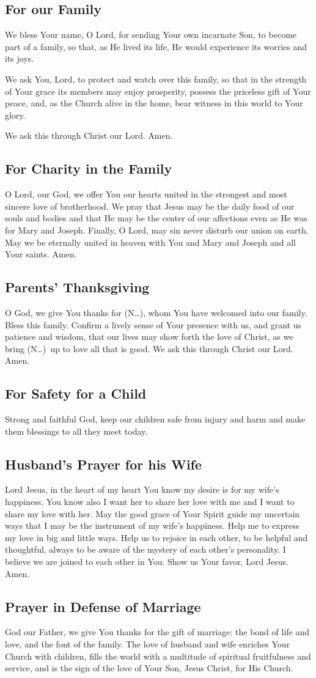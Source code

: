 \documentclass[12pt]{article}
\newcommand{\prayertitle}[1]{\subsection{#1}}
\newcommand{\insertname}{(N\dots)}
\begin{document}
\prayertitle{For our Family}
We bless Your name, O Lord, for sending Your own incarnate Son, to become part of a family, so that, as He lived its life, He would experience its worries and its joys.

We ask You, Lord, to protect and watch over this family, so that in the strength of Your grace its members may enjoy prosperity, possess the priceless gift of Your peace, and, as the Church alive in the home, bear witness in this world to Your glory.

We ask this through Christ our Lord.
Amen.
\newpage
\prayertitle{For Charity in the Family}
O Lord, our God, we offer You our hearts united in the strongest and most sincere love of brotherhood.
We pray that Jesus may be the daily food of our souls and bodies and that He may be the center of our affections even as He was for Mary and Joseph.
Finally, O Lord, may sin never disturb our union on earth.
May we be eternally united in heaven with You and Mary and Joseph and all Your saints.
Amen.

\prayertitle{Parents' Thanksgiving}
O God, we give You thanks for \insertname, whom You have welcomed into our family.
Bless this family.
Confirm a lively sense of Your presence with us, and grant us patience and wisdom, that our lives may show forth the love of Christ, as we bring \insertname\ up to love all that is good.
We ask this through Christ our Lord.
Amen.

\prayertitle{For Safety for a Child}
Strong and faithful God, keep our children safe from injury and harm and make them blessings to all they meet today.

\prayertitle{Husband's Prayer for his Wife}
Lord Jesus, in the heart of my heart You know my desire is for my wife's happiness.
You know also I want her to share her love with me and I want to share my love with her.
May the good grace of Your Spirit guide my uncertain ways that I may be the instrument of my wife's happiness.
Help me to express my love in big and little ways.
Help us to rejoice in each other, to be helpful and thoughtful, always to be aware of the mystery of each other's personality.
I believe we are joined to each other in You.
Show us Your favor, Lord Jesus.
Amen.
\newpage
\prayertitle{Prayer in Defense of Marriage}
\label{prayer:defense_marriage}
God our Father, we give You thanks for the gift of marriage:
the bond of life and love, and the font of the family. 
The love of husband and wife enriches Your Church with children, fills the world with a multitude of spiritual fruitfulness and service,
and is the sign of the love of Your Son, Jesus Christ, for His Church.
\end{document}
